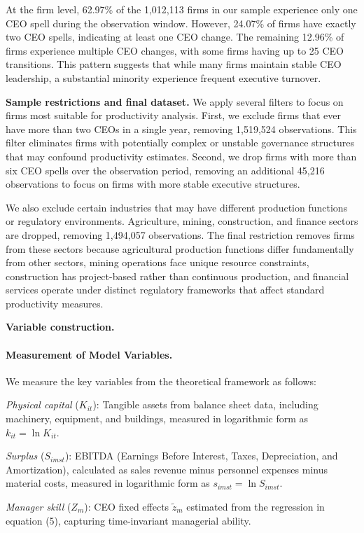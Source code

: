 \documentclass[11pt,a4paper]{article}
\begin{document}
At the firm level, 62.97\% of the 1,012,113 firms in our sample experience only one CEO spell during the observation window. However, 24.07\% of firms have exactly two CEO spells, indicating at least one CEO change. The remaining 12.96\% of firms experience multiple CEO changes, with some firms having up to 25 CEO transitions. This pattern suggests that while many firms maintain stable CEO leadership, a substantial minority experience frequent executive turnover.

\textbf{Sample restrictions and final dataset.} We apply several filters to focus on firms most suitable for productivity analysis. First, we exclude firms that ever have more than two CEOs in a single year, removing 1,519,524 observations. This filter eliminates firms with potentially complex or unstable governance structures that may confound productivity estimates. Second, we drop firms with more than six CEO spells over the observation period, removing an additional 45,216 observations to focus on firms with more stable executive structures.

We also exclude certain industries that may have different production functions or regulatory environments. Agriculture, mining, construction, and finance sectors are dropped, removing 1,494,057 observations. The final restriction removes firms from these sectors because agricultural production functions differ fundamentally from other sectors, mining operations face unique resource constraints, construction has project-based rather than continuous production, and financial services operate under distinct regulatory frameworks that affect standard productivity measures.

\textbf{Variable construction.} 
\paragraph{Measurement of Model Variables.} We measure the key variables from the theoretical framework as follows:

\textit{Physical capital} ($K_{it}$): Tangible assets from balance sheet data, including machinery, equipment, and buildings, measured in logarithmic form as $k_{it} = \ln K_{it}$.

\textit{Surplus} ($S_{imst}$): EBITDA (Earnings Before Interest, Taxes, Depreciation, and Amortization), calculated as sales revenue minus personnel expenses minus material costs, measured in logarithmic form as $s_{imst} = \ln S_{imst}$.

\textit{Manager skill} ($Z_m$): CEO fixed effects $\tilde{z}_m$ estimated from the regression in equation (5), capturing time-invariant managerial ability.
\end{document}
